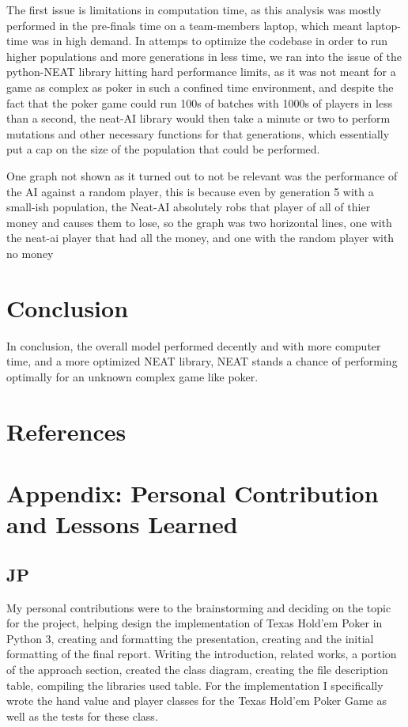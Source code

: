 The first issue is limitations in computation time, as this analysis was mostly performed in the pre-finals time
on a team-members laptop, which meant laptop-time was in high demand. In attemps to optimize the codebase in
order to run higher populations and more generations in less time, we ran into the issue of the python-NEAT
library hitting hard performance limits, as it was not meant for a game as complex as poker in such a confined
time environment, and despite the fact that the poker game could run 100s of batches with 1000s of players in
less than a second, the neat-AI library would then take a minute or two to perform mutations and other
necessary functions for that generations, which essentially put a cap on the size of the population that could
be performed.

One graph not shown as it turned out to not be relevant was the performance of the AI against a random player,
this is because even by generation 5 with a small-ish population, the Neat-AI absolutely robs that player of all
of thier money and causes them to lose, so the graph was two horizontal lines, one with the neat-ai player
that had all the money, and one with the random player with no money

\section{Conclusion}
In conclusion, the overall model performed decently and with more computer time, and a more optimized
NEAT library, NEAT stands a chance of performing optimally for an unknown complex game like poker. 



\section{References}
\printbibliography

\section{Appendix: Personal Contribution and Lessons Learned}
\subsection{JP}
My personal contributions were to the brainstorming and deciding on the topic for the project, helping design the implementation of Texas Hold'em Poker in Python 3, creating and formatting the presentation, creating and the initial formatting of the final report. Writing the introduction, related works, a portion of the approach section, created the class diagram, creating the file description table, compiling the libraries used table. For the implementation I specifically wrote the hand value and player classes for the Texas Hold'em Poker Game as well as the tests for these class.

